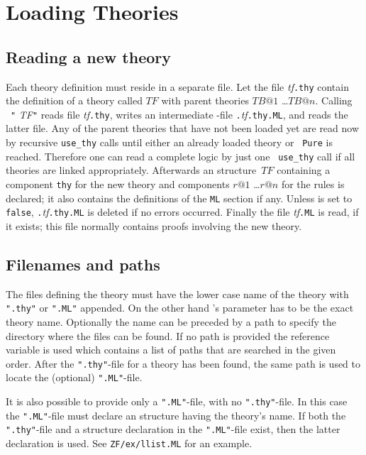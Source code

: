 \section{Loading Theories}
\label{LoadingTheories}
\subsection{Reading a new theory}

Each theory definition must reside in a separate file.  Let the file {\it
  tf}{\tt.thy} contain the definition of a theory called $TF$ with parent
theories $TB@1$ \dots $TB@n$.  Calling ~{\tt"}{\it
  TF\/}{\tt"} reads file {\it tf}{\tt.thy}, writes an intermediate {\ML}-file
{\tt.}{\it tf}{\tt.thy.ML}, and reads the latter file.   Any of the parent theories that have not been loaded yet are read now
by recursive {\tt use_thy} calls until either an already loaded theory or {\tt
  Pure} is reached.  Therefore one can read a complete logic by just one {\tt
use_thy} call if all theories are linked appropriately.  Afterwards an {\ML}
structure~$TF$ containing a component {\tt thy} for the new theory and
components $r@1$ \dots $r@n$ for the rules is declared; it also contains the
definitions of the {\tt ML} section if any. Unless
 is set to {\tt false}, {\tt.}{\it tf}{\tt.thy.ML}
is deleted if no errors occurred. Finally the file {\it tf}{\tt.ML} is read, if
it exists; this file normally contains proofs involving the new theory.


\subsection{Filenames and paths}

The files defining the theory must have the lower case name of the theory
with {\tt".thy"} or {\tt".ML"} appended.  On the other hand
's parameter has to be the exact theory name.  Optionally
the name can be preceded by a path to specify the directory where the
files can be found.  If no path is provided the reference variable
 is used which contains a list of paths that are
searched in the given order.  After the {\tt".thy"}-file for a theory has
been found, the same path is used to locate the (optional) {\tt".ML"}-file.

It is also possible to provide only a {\tt".ML"}-file, with no
{\tt".thy"}-file.  In this case the {\tt".ML"}-file must declare an \ML{}
structure having the theory's name.  If both the {\tt".thy"}-file and a
structure declaration in the {\tt".ML"}-file exist, then the latter
declaration is used.  See {\tt ZF/ex/llist.ML} for an example.


